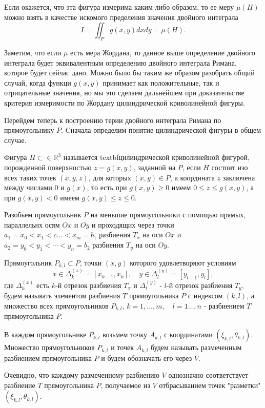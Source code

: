 \par Если окажется, что эта фигура измерима каким-либо образом, то ее меру $\mu (H)$ можно взять в качестве искомого пределения значения двойного интеграла $$I=\iint_P g(x,y)dxdy=\mu (H).$$
\par Заметим, что если $\mu$ есть мера Жордана, то данное выше определение двойного интеграла будет эквивалентным определению двойного интеграла Римана, которое будет сейчас дано. Можно было бы таким же образом разобрать общий случай, когда функци $g(x,y)$ принимает как положительные, так и отрицательные значения, но мы это сделаем  дальнейшем при доказательстве критерия измеримости по Жордану цилиндрической криволинейной фигуры.   
\par Перейдем теперь к построению терии двойного интеграла Римана по прямоугольнику $P$. Cначала определим понятие цилиндрической фигуры в общем случае. 
\begin{object}
Фигура $H\subset \in{\mathbb R}^3$ называется textbf{цилиндрической криволинейной фигурой}, порожденной поверхностью $z=g(x,y)$, заданной на $P$, если $H$ состоит изо всех таких точек $(x,y,z)$, для которых $(x,y)\in P$, а координата $z$ заключена между числами 0 и $g(x)$, то есть при $g(x,y)\ge 0$ имеем $0\le z\le g(x,y)$, а при $g(x,y)<0$ имеем $g(x,y)\le z\le 0$.
\end{object}
\par Разобьем прямоугольник $P$ на меньшие прямоугольники с помощью прямых, параллельнх осям $Ox$ и $Oy$ и проходящих через точки $a_1=x_0<x_1<c\dots <x_m=b_1$ разбиения $T_x$ на оси $Ox$ и $a_2=y_0<y_1<\cdots <y_n=b_2$ разбиения $T_y$ на оси $Oy$.
\par Прямоугольник $P_{k,l}\subset P$, точки $(x,y)$ которого удовлетворяют условиям $$x\in \Delta_k^{(x)}=[x_{k-1},x_k],\quad y\in \Delta_l^{(y)}=[y_{l-1},y_l],$$ где $\Delta_k^{(x)}$ есть $k$-й отрезок разбиения $T_x$ и $\Delta_l^{(y)}$ - $l$-й отрезок разбиения $T_y$, будем называть элементом разбиения $T$ прямоугольника $P$ с индексом $(k,l)$, а множество всех прямоугольников $P_{k,l}$, $k=1,\ldots ,m,\quad l=1\ldots ,n$ - разбиением $T$ прямоугольника $P$.
\par В каждом прямоугольнике $P_{k,l}$ возьмем точку $A_{k,l}$ с координатами $(\xi_{k,l},\theta_{k,l})$. Множество прямоугольников $P_{k,l}$ и точек $A_{k,l}$ будем называть размеченным разбиением прямоугольника $P$ и будем обозначать его через $V$.
\par Очевидно, что каждому размеченному разбиению $V$ однозначно соответствует разбиение $T$ прямоугольника $P$, получаемое из $V$ отбрасыванием точек "разметки" \\$(\xi_{k,l},\theta_{k,l})$. 
